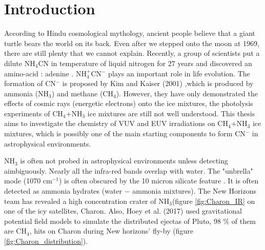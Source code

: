 \chapter{\protect Introduction}
\label{introduction}

According to Hindu cosmological mythology, ancient people believe that a giant turtle bears the world on its back. Even after we stepped onto the moon at 1969, there are still plenty that we cannot explain. Recently, a group of scientists put a dilute NH$_4$CN in temperature of liquid nitrogen for 27 years and discovered an amino-acid : adenine \cite{miyakawa2002cold}. NH$_4^+$CN$^-$ plays an important role in life evolution. The formation of CN$^-$ is proposed by Kim and Kaiser (2001) \cite{kim},which is produced by ammonia (NH$_3$) and methane (CH$_4$). However, they have only demonstrated the effects of cosmic rays (energetic electrons) onto the ice mixtures, the photolysis experiments of CH$_4$+NH$_3$ ice mixtures are still not well understood. This thesis aims to investigate the chemistry of VUV and EUV irradiations on CH$_4$+NH$_3$ ice mixtures, which is possibly one of the main starting components to form CN$^-$ in astrophysical environments.

NH$_3$ is often not probed in astrophysical environments unless detecting aimbiguously. Nearly all the infra-red bands overlap with water. The "unbrella" mode (1070 cm$^{-1}$) is often obscured by the 10 micron silicate feature \cite{d1986time}. It is often detected as ammonia hydrates (water $-$ ammonia mixtures)\cite{cook2007near}. The New Horizons team has revealed a high concentration crater of NH$_3$\cite{grundy2016surface}(figure \ref{fig:Charon_IR} on one of the icy satellites, Charon. Also, Hoey et al. (2017)\cite{hoey2017rarefied} used gravitational potential field models to simulate the distributed ejectas of Pluto, 98 \% of them are CH$_4$, hits on Charon during New horizons' fly-by (figure \ref{fig:Charon_distribution}).

